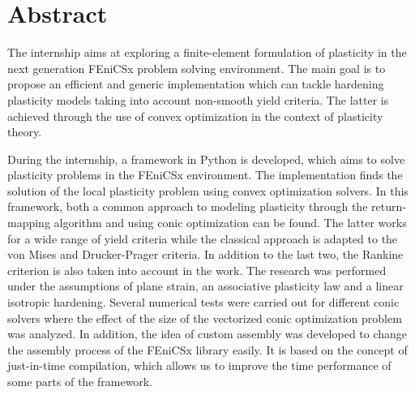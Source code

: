 \documentclass[12pt]{article}
\begin{document}


\newpage
\section*{\centering Abstract}

The internship aims at exploring a finite-element formulation of plasticity in the next generation FEniCSx problem solving environment. The main goal is to propose an efficient and generic implementation which can tackle hardening plasticity models taking into account non-smooth yield criteria. The latter is achieved through the use of convex optimization in the context of plasticity theory.

During the internship, a framework in Python is developed, which aims to solve plasticity problems in the FEniCSx environment. The implementation finds the solution of the local plasticity problem using convex optimization solvers. In this framework, both a common approach to modeling plasticity through the return-mapping algorithm and using conic optimization can be found. The latter works for a wide range of yield criteria while the classical approach is adapted to the von Mises and Drucker-Prager criteria. In addition to the last two, the Rankine criterion is also taken into account in the work. The research was performed under the assumptions of plane strain, an associative plasticity law and a linear isotropic hardening. Several numerical tests were carried out for different conic solvers where the effect of the size of the vectorized conic optimization problem was analyzed. In addition, the idea of custom assembly was developed to change the assembly process of the FEniCSx library easily. It is based on the concept of just-in-time compilation, which allows us to improve the time performance of some parts of the framework.
\end{document}
